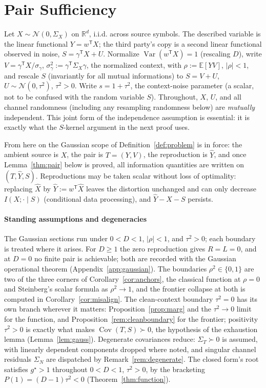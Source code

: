\documentclass[11pt,onecolumn]{IEEEtran}
\newcommand{\E}{\mathbb{E}}
\newcommand{\R}{\mathbb{R}}
\newcommand{\Cov}{\operatorname{Cov}}
\newcommand{\hX}{\widehat{X}}
\newcommand{\hY}{\widehat{Y}}
\begin{document}
\section{Pair Sufficiency}
\label{sec:pair}

Let $X\sim\mathcal N(0,\Sigma_X)$ on $\R^d$, i.i.d. across source symbols.
The described variable is the linear functional $Y=w^{\mathsf T}X$; the third
party's copy is a second linear functional observed in noise,
$S=\gamma^{\mathsf T}X+U$. Normalize
$\operatorname{Var}(w^{\mathsf T}X)=1$ (rescaling $D$), write
$V=\gamma^{\mathsf T}X/\sigma_{\gamma}$, $\sigma_\gamma^2:=\gamma^{\mathsf T}\Sigma_X\gamma$,
the normalized context, with
$\rho:=\E[YV]$, $|\rho|<1$, and
rescale $S$ (invariantly for all mutual informations) to $S=V+U$,
$U\sim\mathcal N(0,\tau^2)$, $\tau^2>0$. Write $s=1+\tau^2$, the
context-noise parameter (a scalar, not to be confused with the random
variable $S$). Throughout,
$X$, $U$, and all channel randomness (including any resampling randomness
below) are \emph{mutually} independent. This joint form of the independence
assumption is essential: it is exactly what the $S$-kernel argument in
the next proof uses.

From here on the Gaussian scope of Definition~\ref{def:problem} is in
force: the ambient source is $X$, the pair is $T=(Y,V)$, the reproduction
is $\hY$, and once Lemma~\ref{thm:pair} below is proved, all
information quantities are written on $(T,\hY,S)$. Reproductions may be
taken scalar without loss of optimality: replacing
$\hX$ by $\hY:=w^{\mathsf T}\hX$ leaves the distortion unchanged and can
only decrease $I(X;\cdot\mid S)$ (conditional data processing), and
$\hY-X-S$ persists.

\paragraph*{Standing assumptions and degeneracies}
The Gaussian sections run under $0<D<1$, $|\rho|<1$, and $\tau^2>0$;
each boundary is treated where it arises.
For $D\ge1$ the zero reproduction gives $R=L=0$, and at $D=0$ no finite
pair is achievable; both are recorded with the Gaussian operational
theorem (Appendix~\ref{app:gaussian}). The boundaries $\rho^2\in\{0,1\}$
are two of the three corners of Corollary~\ref{cor:anchors}, the
classical function at $\rho=0$ and Steinberg's scalar formula as
$\rho^2\to1$, and the frontier collapse at both is computed in
Corollary~\ref{cor:misalign}. The clean-context boundary
$\tau^2=0$ has its own branch wherever it matters:
Proposition~\ref{prop:marg} and the $\tau^2\to0$ limit for the
function, and Proposition~\ref{rem:cleanboundary} for the frontier; positivity
$\tau^2>0$ is exactly what makes $\Cov(T,S)\succ0$, the hypothesis of
the exhaustion lemma (Lemma~\ref{lem:gauss}). Degenerate covariances
reduce: $\Sigma_T\succ0$ is assumed, with linearly dependent components
dropped where noted, and singular channel residuals $\Sigma_N$ are
dispatched by Remark~\ref{rem:degenerate}. The closed form's root satisfies
$g^\star>1$ throughout $0<D<1$, $\tau^2>0$, by the bracketing
$P(1)=(D-1)\tau^2<0$ (Theorem~\ref{thm:function}).
\end{document}

